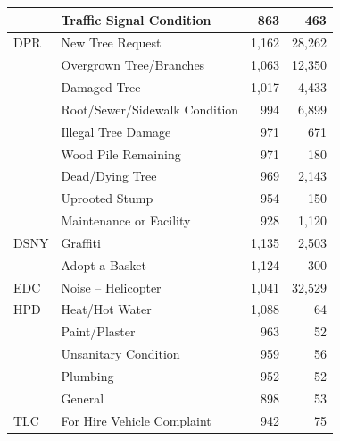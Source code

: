 \documentclass[12pt]{article}
\begin{document}
\begin{table}[t]
\begin{tabular}{llrr}
      & Traffic Signal Condition               &     863 &      463 \\
\midrule
DPR   & New Tree Request                       & 1{,}162 & 28{,}262 \\
      & Overgrown Tree/Branches                & 1{,}063 & 12{,}350 \\
      & Damaged Tree                           & 1{,}017 &  4{,}433 \\
      & Root/Sewer/Sidewalk Condition          &     994 &  6{,}899 \\
      & Illegal Tree Damage                    &     971 &      671 \\
      & Wood Pile Remaining                    &     971 &      180 \\
      & Dead/Dying Tree                        &     969 &  2{,}143 \\
      & Uprooted Stump                         &     954 &      150 \\
      & Maintenance or Facility                &     928 &  1{,}120 \\
\midrule
DSNY  & Graffiti                               & 1{,}135 &  2{,}503 \\
      & Adopt-a-Basket                         & 1{,}124 &      300 \\
\midrule
EDC   & Noise -- Helicopter                    & 1{,}041 & 32{,}529 \\
\midrule
HPD   & Heat/Hot Water                         & 1{,}088 &       64 \\
      & Paint/Plaster                          &     963 &       52 \\
      & Unsanitary Condition                   &     959 &       56 \\
      & Plumbing                               &     952 &       52 \\
      & General                                &     898 &       53 \\
\midrule
TLC   & For Hire Vehicle Complaint             &     942 &       75 \\
\bottomrule
\end{tabular}
\end{table}


\clearpage


\end{document}
